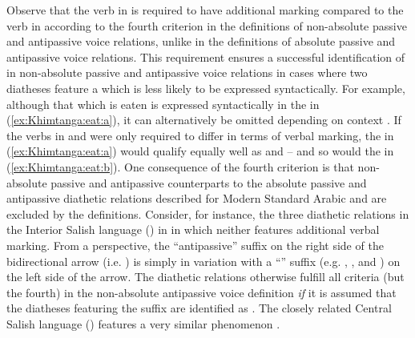 Observe that the verb in  is required to have additional marking compared to the verb in  according to the fourth criterion in the definitions of non-absolute passive and antipassive voice relations, unlike in the definitions of absolute passive and antipassive voice relations. This requirement ensures a successful identification of  in non-absolute passive and antipassive voice relations in cases where two diatheses feature a  which is less likely to be expressed syntactically. For example, although that which is eaten is expressed syntactically in the   in (\ref{ex:Khimtanga:eat:a}), it can alternatively be omitted depending on context \citep[345]{belay:2015}. If the verbs in  and  were only required to differ in terms of verbal marking, the  in (\ref{ex:Khimtanga:eat:a}) would qualify equally well as  and  -- and so would the  in (\ref{ex:Khimtanga:eat:b}). One consequence of the fourth criterion is that non-absolute passive and antipassive counterparts to the absolute passive and antipassive diathetic relations described for Modern Standard Arabic and  are excluded by the definitions. Consider, for instance, the three diathetic relations in the Interior Salish language  () in  in which neither  features additional verbal marking. From a  perspective, the “antipassive” suffix on the right side of the bidirectional arrow (i.e. ) is simply in variation with a “” suffix (e.g. , , and ) on the left side of the arrow. The diathetic relations otherwise fulfill all criteria (but the fourth) in the non-absolute antipassive voice definition \textit{if} it is assumed that the diatheses featuring the suffix  are identified as . The closely related Central Salish language  () features a very similar phenomenon \citep{suttles:2004}.

